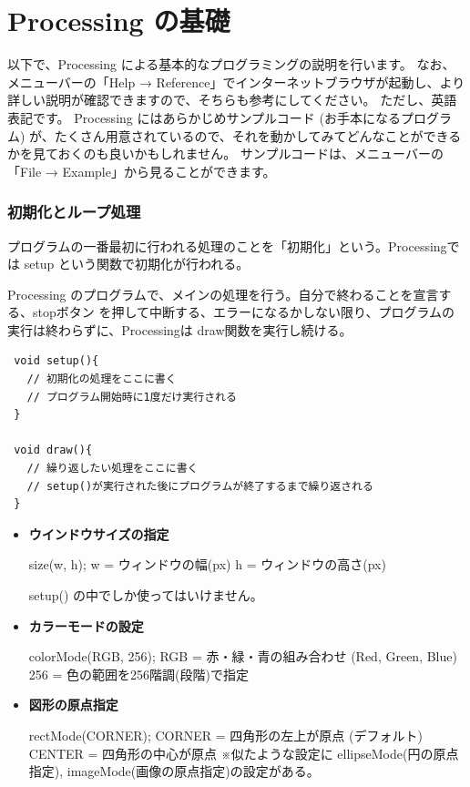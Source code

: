 \documentclass[11pt,a4paper]{jarticle}
\begin{document}
\section{Processing の基礎}
以下で、Processing による基本的なプログラミングの説明を行います。
なお、メニューバーの「Help → Reference」でインターネットブラウザが起動し、より詳しい説明が確認できますので、そちらも参考にしてください。
ただし、英語表記です。
Processing にはあらかじめサンプルコード (お手本になるプログラム) が、たくさん用意されているので、それを動かしてみてどんなことができるかを見ておくのも良いかもしれません。
サンプルコードは、メニューバーの「File → Example」から見ることができます。



\subsubsection*{初期化とループ処理}
プログラムの一番最初に行われる処理のことを「初期化」という。Processingでは setup という関数で初期化が行われる。

Processing のプログラムで、メインの処理を行う。自分で終わることを宣言する、stopボタン
を押して中断する、エラーになるかしない限り、プログラムの実行は終わらずに、Processingは
draw関数を実行し続ける。

\begin{lstlisting}
 void setup(){
   // 初期化の処理をここに書く
   // プログラム開始時に1度だけ実行される
 }

 void draw(){
   // 繰り返したい処理をここに書く
   // setup()が実行された後にプログラムが終了するまで繰り返される
 }
\end{lstlisting}


\begin{itemize}
 \item \textbf{ウインドウサイズの指定}

       size(w, h);
       w = ウィンドウの幅(px)
       h = ウィンドウの高さ(px)

       setup() の中でしか使ってはいけません。
       
 \item \textbf{カラーモードの設定}

       colorMode(RGB, 256);
       RGB = 赤・緑・青の組み合わせ (Red, Green, Blue)
       256 = 色の範囲を256階調(段階)で指定

 \item \textbf{図形の原点指定}

       rectMode(CORNER);
       CORNER = 四角形の左上が原点 (デフォルト)
       CENTER = 四角形の中心が原点
       ※似たような設定に
       ellipseMode(円の原点指定), imageMode(画像の原点指定)の設定がある。
\end{itemize}
\end{document}
